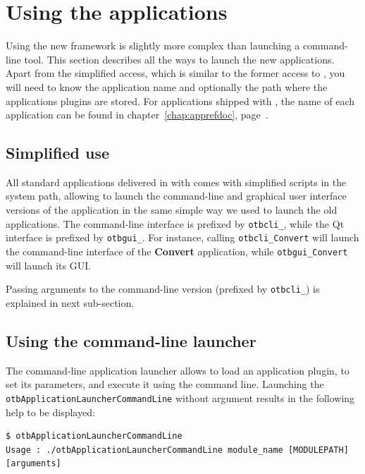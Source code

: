 \section{Using the applications}\label{sec:usingapps}

Using the new \app framework is slightly more complex than launching a
command-line tool. This section describes all the ways to launch the
new applications. Apart from the simplified access, which is similar
to the former access to \app, you will need to know the application 
name and optionally the path where the applications plugins are stored.
For applications shipped with \otb, the name of each 
application can be found in chapter~\ref{chap:apprefdoc}, 
page~\pageref{chap:apprefdoc}.

\subsection{Simplified use}

All standard applications delivered in with \otb comes with simplified
scripts in the system path, allowing to launch the command-line and
 graphical user interface versions of the application in the same simple way
 we used to launch the old applications. The command-line interface is prefixed by
\verb?otbcli_?, while the Qt interface is prefixed by
\verb?otbgui_?. For instance, calling \verb?otbcli_Convert? will
launch the command-line interface of the \textbf{Convert} application,
while \verb?otbgui_Convert? will launch its GUI.


Passing arguments to the command-line version (prefixed by
\verb?otbcli_?) is explained in next sub-section.

\subsection{Using the command-line launcher}

The command-line application launcher allows to load an application
plugin, to set its parameters, and execute it using the command
line. Launching the \verb?otbApplicationLauncherCommandLine?
without argument results in the following help to be displayed:

\begin{verbatim}
$ otbApplicationLauncherCommandLine 
Usage : ./otbApplicationLauncherCommandLine module_name [MODULEPATH] [arguments]
\end{verbatim} 

